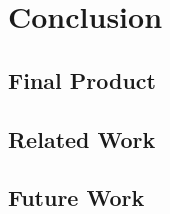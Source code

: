 
\chapter{Conclusion}
\minitoc

\clearpage

\section{Final Product}


\section{Related Work}


\section{Future Work}
